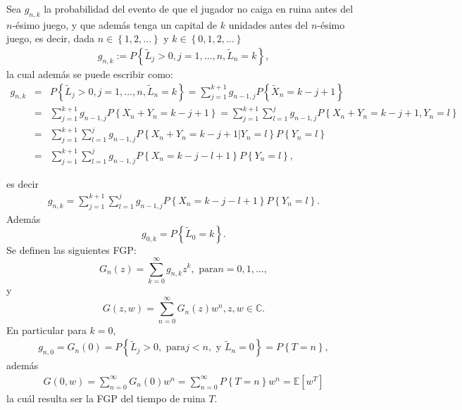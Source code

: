 \documentclass{article}
\newcommand{\esp}{\mathbb{E}}
\numberwithin{equation}{section}
\begin{document}
Sea $g_{n,k}$ la probabilidad del evento de que el jugador no caiga en ruina antes del $n$-\'esimo juego, y que adem\'as tenga un capital de $k$ unidades antes del $n$-\'esimo juego, es decir, dada $n\in\left\{1,2,\ldots\right\}$ y $k\in\left\{0,1,2,\ldots\right\}$
\begin{eqnarray}
g_{n,k}:=P\left\{\tilde{L}_{j}>0, j=1,\ldots,n,
\tilde{L}_{n}=k\right\},
\end{eqnarray}
la cual adem\'as se puede escribir como:
\begin{eqnarray*}
g_{n,k}&=&P\left\{\tilde{L}_{j}>0, j=1,\ldots,n,
\tilde{L}_{n}=k\right\}=\sum_{j=1}^{k+1}g_{n-1,j}P\left\{\tilde{X}_{n}=k-j+1\right\}\\
&=&\sum_{j=1}^{k+1}g_{n-1,j}P\left\{X_{n}+Y_{n}=k-j+1\right\}=\sum_{j=1}^{k+1}\sum_{l=1}^{j}g_{n-1,j}P\left\{X_{n}+Y_{n}=k-j+1,Y_{n}=l\right\}\\
&=&\sum_{j=1}^{k+1}\sum_{l=1}^{j}g_{n-1,j}P\left\{X_{n}+Y_{n}=k-j+1|Y_{n}=l\right\}P\left\{Y_{n}=l\right\}\\
&=&\sum_{j=1}^{k+1}\sum_{l=1}^{j}g_{n-1,j}P\left\{X_{n}=k-j-l+1\right\}P\left\{Y_{n}=l\right\},
\end{eqnarray*}

es decir
\begin{eqnarray}\label{Eq.Gnk.2S}
g_{n,k}=\sum_{j=1}^{k+1}\sum_{l=1}^{j}g_{n-1,j}P\left\{X_{n}=k-j-l+1\right\}P\left\{Y_{n}=l\right\}.
\end{eqnarray}
Adem\'as
\begin{equation}\label{Eq.L02S}
g_{0,k}=P\left\{\tilde{L}_{0}=k\right\}.
\end{equation}
Se definen las siguientes FGP:
\begin{equation}\label{Eq.3.16.a.2S}
G_{n}\left(z\right)=\sum_{k=0}^{\infty}g_{n,k}z^{k},\textrm{ para
}n=0,1,\ldots,
\end{equation}
y 
\begin{equation}\label{Eq.3.16.b.2S}
G\left(z,w\right)=\sum_{n=0}^{\infty}G_{n}\left(z\right)w^{n}, z,w\in\mathbb{C}.
\end{equation}
En particular para $k=0$,
\begin{eqnarray*}
g_{n,0}=G_{n}\left(0\right)=P\left\{\tilde{L}_{j}>0,\textrm{ para
}j<n,\textrm{ y }\tilde{L}_{n}=0\right\}=P\left\{T=n\right\},
\end{eqnarray*}
adem\'as
\begin{eqnarray*}%
G\left(0,w\right)=\sum_{n=0}^{\infty}G_{n}\left(0\right)w^{n}=\sum_{n=0}^{\infty}P\left\{T=n\right\}w^{n}
=\esp\left[w^{T}\right]
\end{eqnarray*}
la cu\'al resulta ser la FGP del tiempo de ruina $T$.
\end{document}
